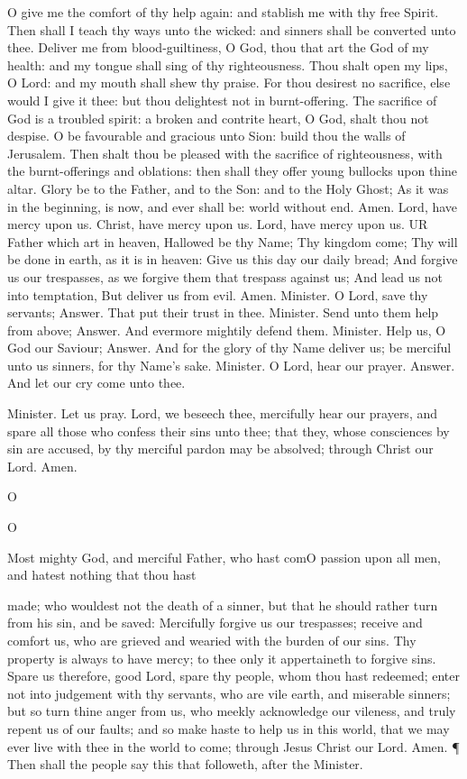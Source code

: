 O give me the comfort of thy help again: and stablish me with thy free Spirit. Then shall I teach thy ways unto the wicked: and sinners shall be converted unto thee. Deliver me from blood-guiltiness, O God, thou that art the God of my health: and my tongue shall sing of thy righteousness. Thou shalt open my lips, O Lord: and my mouth shall shew thy praise. For thou desirest no sacrifice, else would I give it thee: but thou delightest not in burnt-offering. The sacrifice of God is a troubled spirit: a broken and contrite heart, O God, shalt thou not despise. O be favourable and gracious unto Sion: build thou the walls of Jerusalem. Then shalt thou be pleased with the sacrifice of righteousness, with the burnt-offerings and oblations: then shall they offer young bullocks upon thine altar. Glory be to the Father, and to the Son: and to the Holy Ghost; As it was in the beginning, is now, and ever shall be: world without end. Amen. Lord, have mercy upon us. Christ, have mercy upon us. Lord, have mercy upon us. UR Father which art in heaven, Hallowed be thy Name; Thy kingdom come; Thy will be done in earth, as it is in heaven: Give us this day our daily bread; And forgive us our trespasses, as we forgive them that trespass against us; And lead us not into temptation, But deliver us from evil. Amen. Minister. O Lord, save thy servants; Answer. That put their trust in thee. Minister. Send unto them help from above; Answer. And evermore mightily defend them. Minister. Help us, O God our Saviour; Answer. And for the glory of thy Name deliver us; be merciful unto us sinners, for thy Name’s sake. Minister. O Lord, hear our prayer. Answer. And let our cry come unto thee.

Minister. Let us pray. Lord, we beseech thee, mercifully hear our prayers, and spare all those who confess their sins unto thee; that they, whose consciences by sin are accused, by thy merciful pardon may be absolved; through Christ our Lord. Amen.

O

O

Most mighty God, and merciful Father, who hast comO passion upon all men, and hatest nothing that thou hast

made; who wouldest not the death of a sinner, but that he should rather turn from his sin, and be saved: Mercifully forgive us our trespasses; receive and comfort us, who are grieved and wearied with the burden of our sins. Thy property is always to have mercy; to thee only it appertaineth to forgive sins. Spare us therefore, good Lord, spare thy people, whom thou hast redeemed; enter not into judgement with thy servants, who are vile earth, and miserable sinners; but so turn thine anger from us, who meekly acknowledge our vileness, and truly repent us of our faults; and so make haste to help us in this world, that we may ever live with thee in the world to come; through Jesus Christ our Lord. Amen. ¶ Then shall the people say this that followeth, after the Minister.

